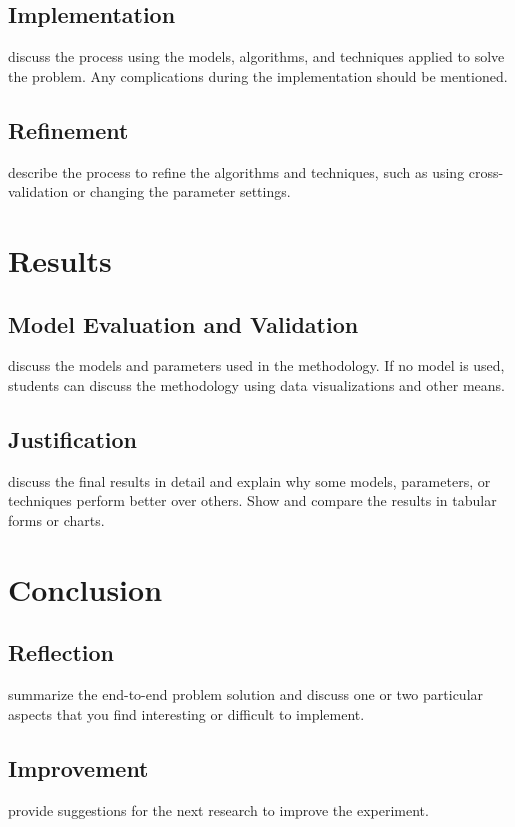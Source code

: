\documentclass[12pt]{article}
\begin{document}
\subsection{Implementation}
discuss the process using the models, algorithms, and techniques applied to solve the problem. Any complications during the implementation should be mentioned.
\subsection{Refinement}
describe the process to refine the algorithms and techniques, such as using cross-validation or changing the parameter settings.

\section{Results}
\subsection{Model Evaluation and Validation}
discuss the models and parameters used in the methodology. If no model is used, students can discuss the methodology using data visualizations and other means.
\subsection{Justification}
 discuss the final results in detail and explain why some models, parameters, or techniques perform better over others. Show and compare the results in tabular forms or charts.

\section{Conclusion}
\subsection{Reflection}
 summarize the end-to-end problem solution and discuss one or two particular aspects that you find interesting or difficult to implement.
\subsection{Improvement}
 provide suggestions for the next research to improve the experiment.
\end{document}
